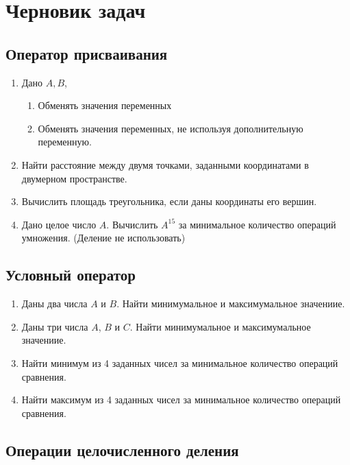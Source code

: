 \newpage
\section{Черновик задач}

\subsection{Оператор присваивания}

\begin{enumerate}
  \item Дано $A, B$,
    \begin{enumerate}
      \item Обменять значения переменных
      \item Обменять значения переменных, не используя дополнительную переменную.
    \end{enumerate}

  \item Найти расстояние между двумя точками, заданными координатами в двумерном пространстве.

  \item Вычислить площадь треугольника, если даны координаты его вершин.

  \item Дано целое число $A$. Вычислить $A^15$ за минимальное количество операций умножения. (Деление не использовать)
\end{enumerate}

\subsection{Условный оператор}

\begin{enumerate}
  \item Даны два числа $A$ и $B$. Найти минимумальное и максимумальное значениие.

  \item Даны три числа $A$, $B$ и $C$. Найти минимумальное и максимумальное значениие.

  \item Найти минимум из 4 заданных чисел за минимальное количество операций сравнения.

  \item Найти максимум из 4 заданных чисел за минимальное количество операций сравнения.
\end{enumerate}

\subsection{Операции целочисленного деления}

